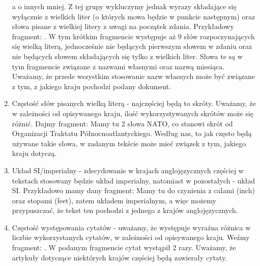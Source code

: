 \documentclass{classrep}
\begin{document}
\begin{enumerate}
	a o innych mniej. Z tej grupy wykluczymy jednak wyrazy składające się wyłącznie z wielkich liter (o których mowa będzie w punkcie następnym) oraz słowa pisane z wielkiej litery z uwagi na początek zdania. Przykładowy fragment: . W tym krótkim fragmencie występuje aż 9 słów rozpoczynających się wielką literą, jednocześnie nie będących pierwszym słowem w zdaniu oraz nie będących słowem składających się tylko z wielkich liter. Słowa te są w tym fragmencie związane z nazwami własnymi oraz nazwą miesiąca. Uważamy, że przede wszystkim stosowanie nazw własnych może być związane z tym, z jakiego kraju pochodzi podany dokument.
    \item Częstość słów pisanych wielką literą - najczęściej będą to skróty. Uważamy, że w zależności od opisywanego kraju, ilość wykorzystywanych skrótów może się różnić. Dajmy fragment:  Mamy tu 2 słowa NATO, co stanowi skrót od Organizacji Traktatu Północnoatlantyckiego. Według nas, to jak często będą używane takie słowa, w zadanym tekście może mieć związek z tym, jakiego kraju dotyczą.
    \item Układ SI/imperialny - zdecydowanie w krajach anglojęzycznych częściej w tekstach stosowany będzie układ imperialny, natomiast w pozostałych - układ SI.
    Przykładowo mamy dany fragment:
     Mamy tu do czynienia z calami (inch) oraz stopami (feet), zatem układem imperialnym, a więc możemy przypuszczać, że tekst ten pochodzi z jednego z krajów anglojęzycznych. 
    \item Częstość występowania cytatów - uważamy, że występuje wyraźna różnica w liczbie wykorzystanych cytatów, w zależności od opisywanego kraju. Weźmy fragment: . W podanym fragmencie cytat wystąpił 2 razy. Uważamy, że artykuły dotyczące niektórych krajów częściej będą zawierały cytaty.

\end{enumerate}
\end{document}
